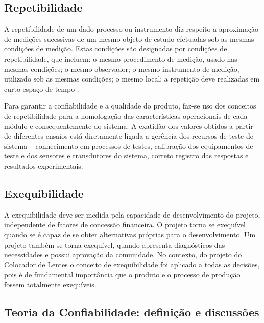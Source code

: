 \begin{anexosenv}
\subsection[Repetibilidade]{Repetibilidade}

A repetibilidade de um dado processo ou instrumento diz respeito a aproximação de medições sucessivas de um mesmo objeto de estudo efetuadas sob as mesmas condições de medição. Estas condições são designadas por condições de repetibilidade, que incluem: o mesmo procedimento de medição, usado nas mesmas condições; o mesmo observador; o mesmo instrumento de medição, utilizado sob as mesmas condições; o mesmo local; a repetição deve realizadas em curto espaço de tempo \cite{aurelio}. 

Para garantir a confiabilidade e a qualidade do produto, faz-se uso dos conceitos de repetibilidade para a homologação das características operacionais de cada módulo e consequentemente do sistema. A exatidão dos valores obtidos a partir de diferentes ensaios está diretamente ligada a gerência dos recursos de teste de sistema – conhecimento em processos de testes, calibração dos equipamentos de teste e dos sensores e transdutores do sistema, correto registro das respostas e resultados experimentais.

\subsection[Exequibilidade]{Exequibilidade}

A exequibilidade deve ser medida pela capacidade de desenvolvimento do projeto, independente de fatores de concessão financeira. O projeto torna se exequível quando se é capaz de se obter alternativas próprias para o desenvolvimento. Um projeto também se torna exequível, quando apresenta diagnósticos das necessidades e possui aprovação da comunidade. No contexto, do projeto do Colocador de Lentes o conceito de exequibilidade foi aplicado a todas as decisões, pois é de fundamental importância que o produto e o processo de produção fossem totalmente exequíveis.

\subsection[Teoria da Confiabilidade: definição e discussões]{Teoria da Confiabilidade: definição e discussões}


\end{anexosenv}
